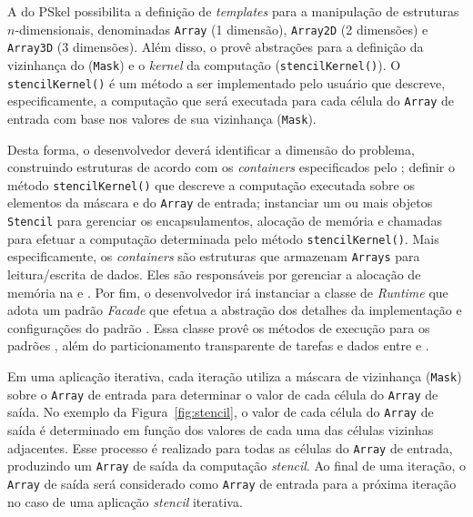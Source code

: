 A \api do PSkel possibilita a definição de \textit{templates} para a manipulação
de estruturas $n$-dimensionais, denominadas \texttt{Array} (1 dimensão),
\texttt{Array2D} (2 dimensões) e \texttt{Array3D} (3 dimensões). Além disso, o
\fw provê abstrações para a definição da vizinhança do \stencil (\texttt{Mask})
e o \textit{kernel} da computação \stencil (\texttt{stencilKernel()}). O
\texttt{stencilKernel()} é um método a ser implementado pelo usuário que
descreve, especificamente, a computação que será executada para cada célula do
\texttt{Array} de entrada com base nos valores de sua vizinhança (\texttt{Mask}).

Desta forma, o desenvolvedor deverá identificar a dimensão do problema,
construindo estruturas de acordo com os \textit{containers} especificados pelo
\fw; definir o método \texttt{stencilKernel()} que descreve a computação executada
sobre os elementos da máscara e do \texttt{Array} de entrada; instanciar um ou
mais objetos \texttt{Stencil} para gerenciar os encapsulamentos, alocação de
memória e chamadas para efetuar a computação determinada pelo método
\texttt{stencilKernel()}. Mais especificamente, os \textit{containers} são
estruturas que armazenam \texttt{Arrays} para leitura/escrita de dados. Eles são
responsáveis por gerenciar a alocação de memória na \cpu e \gpu.
Por fim, o desenvolvedor irá instanciar a classe de \textit{Runtime} que adota
um padrão \textit{Facade} que efetua a abstração dos detalhes da implementação e
configurações do padrão \stencil. Essa classe provê os métodos de execução para
os padrões \stencil, além do particionamento transparente de tarefas e dados
entre \cpu e \gpu.

%

Em uma aplicação \stencil iterativa, cada iteração utiliza a máscara de
vizinhança (\texttt{Mask}) sobre o \texttt{Array} de entrada para determinar o
valor de cada célula do \texttt{Array} de saída. No exemplo da
Figura~\ref{fig:stencil}, o valor de cada célula do \texttt{Array} de saída é
determinado em função dos valores de cada uma das células vizinhas adjacentes.
Esse processo é realizado para todas as células do \texttt{Array} de entrada,
produzindo um \texttt{Array} de saída da computação \textit{stencil}. Ao final de uma
iteração, o \texttt{Array} de saída será considerado como \texttt{Array} de
entrada para a próxima iteração no caso de uma aplicação \textit{stencil} iterativa.

